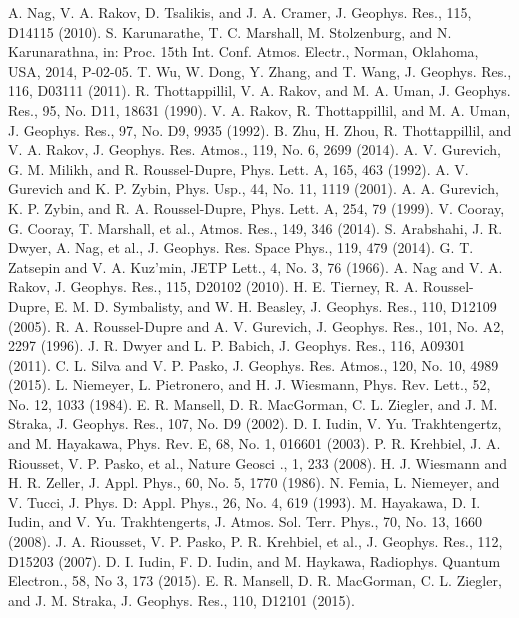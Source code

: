 \documentclass[a4paper, 12pt, onecolumn,singlespacing]{article}
\begin{document}
\begin{thebibliography}{99}
\bibitem{} A. Nag, V. A. Rakov, D. Tsalikis, and J. A. Cramer, J. Geophys. Res., 115, D14115 (2010).
\bibitem{} S. Karunarathe, T. C. Marshall, M. Stolzenburg, and N. Karunarathna, in: Proc. 15th Int. Conf. Atmos. Electr., Norman, Oklahoma, USA, 2014, P-02-05.
\bibitem{} T. Wu, W. Dong, Y. Zhang, and T. Wang, J. Geophys. Res., 116, D03111 (2011).
\bibitem{} R. Thottappillil, V. A. Rakov, and M. A. Uman, J. Geophys. Res., 95, No. D11, 18631 (1990).
\bibitem{} V. A. Rakov, R. Thottappillil, and M. A. Uman, J. Geophys. Res., 97, No. D9, 9935 (1992).
\bibitem{} B. Zhu, H. Zhou, R. Thottappillil, and V. A. Rakov, J. Geophys. Res. Atmos., 119, No. 6, 2699 (2014).
\bibitem{} A. V. Gurevich, G. M. Milikh, and R. Roussel-Dupre, Phys. Lett. A, 165, 463 (1992).
\bibitem{} A. V. Gurevich and K. P. Zybin, Phys. Usp., 44, No. 11, 1119 (2001).
\bibitem{} A. A. Gurevich, K. P. Zybin, and R. A. Roussel-Dupre, Phys. Lett. A, 254, 79 (1999).
\bibitem{} V. Cooray, G. Cooray, T. Marshall, et al., Atmos. Res., 149, 346 (2014).
\bibitem{} S. Arabshahi, J. R. Dwyer, A. Nag, et al., J. Geophys. Res. Space Phys., 119, 479 (2014).
\bibitem{} G. T. Zatsepin and V. A. Kuz’min, JETP Lett., 4, No. 3, 76 (1966).
\bibitem{} A. Nag and V. A. Rakov, J. Geophys. Res., 115, D20102 (2010).
\bibitem{} H. E. Tierney, R. A. Roussel-Dupre, E. M. D. Symbalisty, and W. H. Beasley, J. Geophys. Res., 110, D12109 (2005).
\bibitem{} R. A. Roussel-Dupre and A. V. Gurevich, J. Geophys. Res., 101, No. A2, 2297 (1996).
\bibitem{} J. R. Dwyer and L. P. Babich, J. Geophys. Res., 116, A09301 (2011).
\bibitem{} C. L. Silva and V. P. Pasko, J. Geophys. Res. Atmos., 120, No. 10, 4989 (2015).
\bibitem{} L. Niemeyer, L. Pietronero, and H. J. Wiesmann, Phys. Rev. Lett., 52, No. 12, 1033 (1984).
\bibitem{} E. R. Mansell, D. R. MacGorman, C. L. Ziegler, and J. M. Straka, J. Geophys. Res., 107, No. D9 (2002).
\bibitem{} D. I. Iudin, V. Yu. Trakhtengertz, and M. Hayakawa, Phys. Rev. E, 68, No. 1, 016601 (2003).
\bibitem{} P. R. Krehbiel, J. A. Riousset, V. P. Pasko, et al., Nature Geosci ., 1, 233 (2008).
\bibitem{} H. J. Wiesmann and H. R. Zeller, J. Appl. Phys., 60, No. 5, 1770 (1986).
\bibitem{} N. Femia, L. Niemeyer, and V. Tucci, J. Phys. D: Appl. Phys., 26, No. 4, 619 (1993).
\bibitem{} M. Hayakawa, D. I. Iudin, and V. Yu. Trakhtengerts, J. Atmos. Sol. Terr. Phys., 70, No. 13, 1660 (2008).
\bibitem{} J. A. Riousset, V. P. Pasko, P. R. Krehbiel, et al., J. Geophys. Res., 112, D15203 (2007).
\bibitem{} D. I. Iudin, F. D. Iudin, and M. Haykawa, Radiophys. Quantum Electron., 58, No 3, 173 (2015).
\bibitem{} E. R. Mansell, D. R. MacGorman, C. L. Ziegler, and J. M. Straka, J. Geophys. Res., 110, D12101 (2015).

\end{thebibliography}
\end{document}
